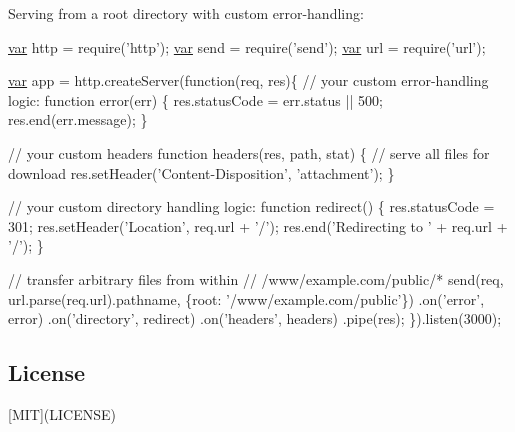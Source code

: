 Serving from a root directory with custom error-\/handling\+:


\begin{DoxyCode}
\hyperlink{018__def_8c_a335628f2e9085305224b4f9cc6e95ed5}{var} http = require(\textcolor{stringliteral}{'http'});
\hyperlink{018__def_8c_a335628f2e9085305224b4f9cc6e95ed5}{var} send = require(\textcolor{stringliteral}{'send'});
\hyperlink{018__def_8c_a335628f2e9085305224b4f9cc6e95ed5}{var} url = require(\textcolor{stringliteral}{'url'});

\hyperlink{018__def_8c_a335628f2e9085305224b4f9cc6e95ed5}{var} app = http.createServer(\textcolor{keyword}{function}(req, res)\{
  \textcolor{comment}{// your custom error-handling logic:}
  \textcolor{keyword}{function} error(err) \{
    res.statusCode = err.status || 500;
    res.end(err.message);
  \}

  \textcolor{comment}{// your custom headers}
  \textcolor{keyword}{function} headers(res, path, stat) \{
    \textcolor{comment}{// serve all files for download}
    res.setHeader(\textcolor{stringliteral}{'Content-Disposition'}, \textcolor{stringliteral}{'attachment'});
  \}

  \textcolor{comment}{// your custom directory handling logic:}
  \textcolor{keyword}{function} redirect() \{
    res.statusCode = 301;
    res.setHeader(\textcolor{stringliteral}{'Location'}, req.url + \textcolor{charliteral}{'/'});
    res.end(\textcolor{stringliteral}{'Redirecting to '} + req.url + \textcolor{charliteral}{'/'});
  \}

  \textcolor{comment}{// transfer arbitrary files from within}
  \textcolor{comment}{// /www/example.com/public/*}
  send(req, url.parse(req.url).pathname, \{root: \textcolor{stringliteral}{'/www/example.com/public'}\})
  .on(\textcolor{stringliteral}{'error'}, error)
  .on(\textcolor{stringliteral}{'directory'}, redirect)
  .on(\textcolor{stringliteral}{'headers'}, headers)
  .pipe(res);
\}).listen(3000);
\end{DoxyCode}


\subsection*{License}

\mbox{[}M\+I\+T\mbox{]}(L\+I\+C\+E\+N\+S\+E) 